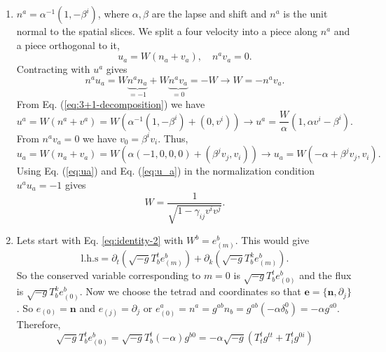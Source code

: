 \documentclass[10pt]{article}
\begin{document}
\begin{enumerate}
\item $n^a = \alpha^{-1}(1, -\beta^i)$, where $\alpha, \beta$ are the lapse and shift and $n^a$ is the unit normal to the spatial slices. We split a four velocity into a piece along $n^a$ and a piece orthogonal to it,
  \begin{equation}
    \label{eq:3+1-decomposition}
    u_a = W(n_a + v_a),\quad n^av_a = 0.
  \end{equation}
  Contracting with $u^a$ gives
  \begin{equation}
    \label{eq:contract-with-na}
    n^au_a = W \underbrace{n^a n_a}_{=-1} + W \underbrace{n^av_a}_{=0} =- W \rightarrow \boxed{W = -n^av_a}.
  \end{equation}
  From Eq. (\ref{eq:3+1-decomposition}) we have
  \begin{equation}
    \label{eq:ua}
    u^a = W(n^a + v^a) = W(\alpha^{-1}(1, -\beta^i) + (0, v^i)) \rightarrow \boxed{u^a = \frac{W}{\alpha}(1, \alpha v^i - \beta^i)}.
  \end{equation}
  From $n^av_a = 0$ we have $v_0 = \beta^i v_i$. Thus,
  \begin{equation}
    \label{eq:u_a}
    u_a = W(n_a + v_a) = W(\alpha(-1,0,0,0) + (\beta^j v_j, v_i)) \rightarrow\boxed{u_a = W (-\alpha + \beta^j v_j, v_i)}.
  \end{equation}
  Using Eq. (\ref{eq:ua}) and Eq. (\ref{eq:u_a}) in the normalization condition $u^au_a = -1$ gives
  \begin{equation}
    \label{eq:Lorenzt-factor}
    \boxed{W = \frac{1}{\sqrt{1 - \gamma_{ij}v^i v^j}}}.
  \end{equation}
\item Lets start with Eq. \eqref{eq:identity-2} with $W^b = e^b_{(m)}$. This would give
  \begin{equation}
    \label{eq:conserved-variable}
    \textrm{l.h.s} = \partial_t(\sqrt{-g}T^t_b e^b_{(m)}) + \partial_k(\sqrt{-g}T^k_b e^b_{(m)}).
  \end{equation}
  So the conserved variable corresponding to $m = 0$ is $\sqrt{-g}T^t_b e^b_{(0)}$ and the flux is $\sqrt{-g}T^k_b e^b_{(0)}$. Now we choose the tetrad and coordinates so that $\mathbf{e} = \{\mathbf{n}, \partial_j\}$. So $e_{(0)} = \mathbf{n}$ and $e_{(j)} = \partial_j$ or $e^a_{(0)} = n^a = g^{ab}n_b = g^{ab}(-\alpha \delta^{0}_b) = -\alpha g^{a0}$. Therefore,
  \begin{equation}
    \label{eq:conserved-variable-t}
    \sqrt{-g}T^t_b e^b_{(0)} = \sqrt{-g}T^t_b (-\alpha)g^{b0} = -\alpha \sqrt{-g}(T^t_t g^{tt} + T^t_i g^{0i})

\end{equation}
\end{enumerate}
\end{document}
